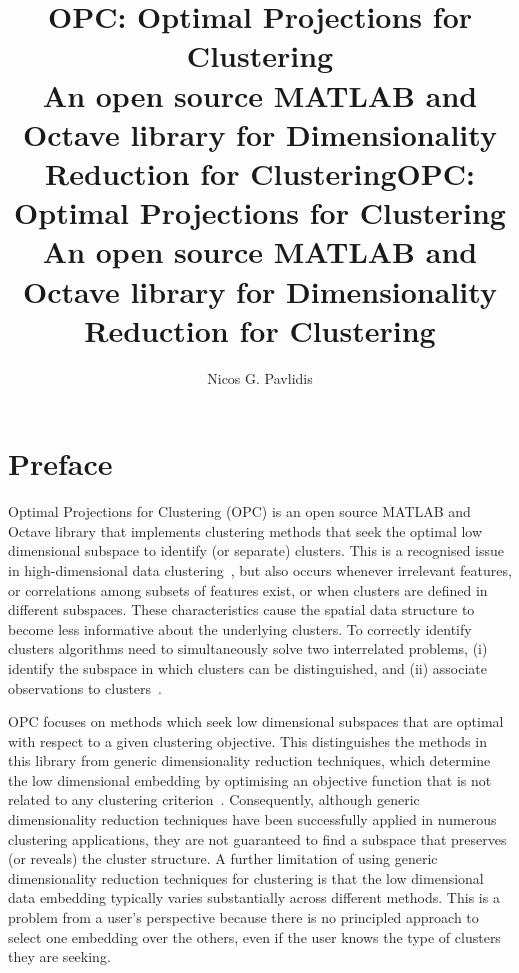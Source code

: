 \documentclass{book}
\title{OPC: Optimal Projections for Clustering \\ {\large An open source MATLAB and Octave library for Dimensionality Reduction for Clustering}}
\title{OPC: Optimal Projections for Clustering \\ {\small An open source MATLAB and Octave library for Dimensionality Reduction for Clustering}}
\author{Nicos G. Pavlidis}
\date{}
\def\mm#1{$#1$}
\begin{document}
\begin{htmlonly}
\def\href#1#2{\htmladdnormallink{#2}{#1}}
\def\mm#1{{\it #1}}
\end{htmlonly}

\maketitle
\tableofcontents

\chapter{Preface}

Optimal Projections for Clustering (OPC)
is an open source MATLAB and Octave library that implements
clustering methods that seek the optimal low dimensional subspace to identify
(or separate) clusters.
%
This is a recognised issue in high-dimensional data
clustering~\cite{KriegelKZ2009}, but also occurs whenever irrelevant features,
or correlations among subsets of features exist, or when
clusters are defined in different subspaces. These characteristics cause
the spatial data structure to become
less informative about the underlying clusters. To correctly identify clusters
algorithms need to simultaneously solve two interrelated problems,
(i) identify the subspace in which clusters can be distinguished, and (ii)
associate observations to clusters~\cite{KriegelKZ2009}.



OPC focuses on methods which seek low dimensional subspaces that are optimal
with respect to a given clustering objective.
%
This distinguishes the methods in this library from generic dimensionality
reduction techniques,
%
which determine the low dimensional embedding by optimising an objective
function that is not related to any clustering criterion~\cite{MaatenPH2009}. 
%
Consequently, although generic dimensionality reduction techniques have been
successfully applied in numerous clustering applications, they are not
guaranteed to find a subspace that preserves (or reveals) the cluster
structure. 
%
A further limitation of using generic dimensionality reduction techniques for
clustering is that the low dimensional data embedding typically varies
substantially across different methods. This is a problem from a user's
perspective because there is no principled approach to select one embedding
over the others, even if the user knows the type of clusters they are
seeking.
\end{document}
